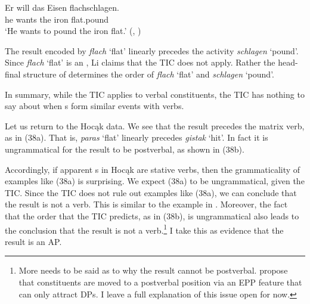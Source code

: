 \documentclass[output=paper]{LSP/langsci}
\begin{document}
\begin{exe}
\ex\label{ex:rosen:37}
 \gll Er will das Eisen flachschlagen.\\
he wants the iron flat.pound\\
\glt `He wants to pound the iron flat.' (\citealt[501]{Li1993}, )

\end{exe}

The result encoded by \textit{flach} `flat' linearly precedes the activity \textit{schlagen} `pound'. Since \textit{flach} `flat' is an , Li claims that the TIC does not apply. Rather the head-final structure of  determines the order of \textit{flach} `flat' and \textit{schlagen} `pound'. 

In summary, while the TIC applies to verbal constituents, the TIC has nothing to say about when s form similar events with verbs.

Let us return to the Hocąk data. We see that the result precedes the matrix verb, as in (38a). That is, \textit{paras} `flat' linearly precedes \textit{gistak} `hit'. In fact it is ungrammatical for the result to be postverbal, as shown in (38b).

\begin{exe}
\ex\label{ex:rosen:38}
\begin{xlist}



\end{xlist}
\end{exe}

Accordingly, if apparent s in Hocąk are stative verbs, then the grammaticality of examples like (38a) is surprising. We expect (38a) to be ungrammatical, given the TIC. Since the TIC does not rule out examples like (38a), we can conclude that the result is not a verb. This is similar to the  example in . Moreover, the fact that the order that the TIC predicts, as in (38b), is ungrammatical also leads to the conclusion that the result is not a verb.\footnote{More needs to be said as to why the result cannot be postverbal. \citet{JohnsonRosen2014} propose that constituents are moved to a postverbal position via an EPP feature that can only attract DPs. I leave a full explanation of this issue open for now.} I take this as evidence that the result is an AP.
\end{document}
